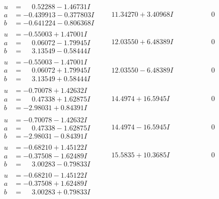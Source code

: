 \documentclass[1p]{elsarticle_modified}
\theoremstyle{definition}
\begin{document}
$$\begin{array}{c|c|c}
\begin{aligned}
u &= \phantom{-}0.52288 - 1.46731 I \\
a &= -0.439913 - 0.377803 I \\
b &= -0.641224 - 0.806368 I\end{aligned}
 & \phantom{-}11.34270 + 3.40968 I & \phantom{-0.000000 } 0 \\ \hline\begin{aligned}
u &= -0.55003 + 1.47001 I \\
a &= \phantom{-}0.06072 - 1.79945 I \\
b &= \phantom{-}3.13549 - 0.58444 I\end{aligned}
 & \phantom{-}12.03550 + 6.48389 I & \phantom{-0.000000 } 0 \\ \hline\begin{aligned}
u &= -0.55003 - 1.47001 I \\
a &= \phantom{-}0.06072 + 1.79945 I \\
b &= \phantom{-}3.13549 + 0.58444 I\end{aligned}
 & \phantom{-}12.03550 - 6.48389 I & \phantom{-0.000000 } 0 \\ \hline\begin{aligned}
u &= -0.70078 + 1.42632 I \\
a &= \phantom{-}0.47338 + 1.62875 I \\
b &= -2.98031 + 0.84391 I\end{aligned}
 & \phantom{-}14.4974 + 16.5945 I & \phantom{-0.000000 } 0 \\ \hline\begin{aligned}
u &= -0.70078 - 1.42632 I \\
a &= \phantom{-}0.47338 - 1.62875 I \\
b &= -2.98031 - 0.84391 I\end{aligned}
 & \phantom{-}14.4974 - 16.5945 I & \phantom{-0.000000 } 0 \\ \hline\begin{aligned}
u &= -0.68210 + 1.45122 I \\
a &= -0.37508 - 1.62489 I \\
b &= \phantom{-}3.00283 - 0.79833 I\end{aligned}
 & \phantom{-}15.5835 + 10.3685 I & \phantom{-0.000000 } 0 \\ \hline\begin{aligned}
u &= -0.68210 - 1.45122 I \\
a &= -0.37508 + 1.62489 I \\
b &= \phantom{-}3.00283 + 0.79833 I\end{aligned}

\end{array}$$
\end{document}
